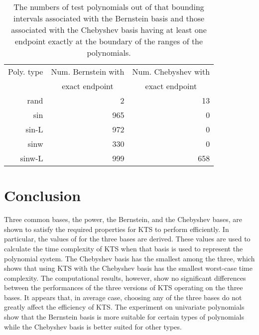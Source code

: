 \documentclass[12pt]{article}
\begin{document}
\begin{table}
\caption{The numbers of test polynomials out of  that
bounding intervals associated with the Bernstein basis and those
associated with the Chebyshev basis having at least one endpoint
exactly at the boundary of the ranges of the polynomials.
\label{table_bc} }
\begin{center}
\begin{tabular}{|r|r|r|}
\hline Poly. type & Num. Bernstein with & Num. Chebyshev with \\
& \multicolumn{1}{c}{ exact endpoint}\vline & \multicolumn{1}{c}{ exact endpoint}\vline  \\
 \hline \hline
rand & 2 & 13 \\
sin & 965 & 0 \\
sin-L & 972 & 0\\
sinw & 330 & 0 \\
sinw-L & 999 & 658 \\
\hline
\end{tabular}
\end{center}
\end{table}

\section{Conclusion}

Three common bases, the power, the Bernstein, and the Chebyshev
bases, are shown to satisfy the required properties for KTS to
perform efficiently. In particular, the values of  for the
three bases are derived. These values are used to calculate the
time complexity of KTS when that basis is used to represent the
polynomial system.  The Chebyshev basis has the smallest 
among the three, which shows that using KTS with the Chebyshev
basis has the smallest worst-case time complexity.  The
computational results, however, show no significant differences
between the performances of the three versions of KTS operating
on the three bases. It appears that, in average case, choosing any
of the three bases do not greatly affect the efficiency of KTS.
The experiment on univariate polynomials show that the Bernstein
basis is more suitable for certain types of polynomials while the
Chebyshev basis is better suited for other types.


\end{document}
